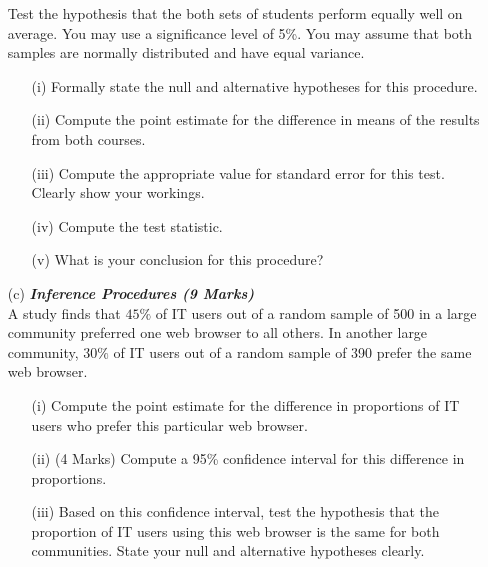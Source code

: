 \documentclass[]{article}
\begin{document}
\begin{itemize}
Test the hypothesis that the both sets of students perform equally well on average. You may use a significance level of 5\%. You may assume that both samples are normally distributed and have equal variance.
\begin{itemize}
\item[(i)]  Formally state the null and alternative hypotheses for this procedure.
\item[(ii)]  Compute the point estimate for the difference in means of the results from both courses.
\item[(iii)]  Compute the appropriate value for standard error for this test. Clearly show your workings.
\item[(iv)]  Compute the test statistic.
\item[(v)]  What is your conclusion for this procedure?
\end{itemize}

\newpage
\item[(c)] \textbf{\textit{Inference Procedures (9 Marks)}}\\A study finds that $45\%$ of IT users out of a random sample of 500 in a large
community preferred one web browser to all others. In another large community, $30\%$ of IT users out of a random sample of 390 prefer the same web browser.

\begin{itemize}
\item[(i)]  Compute the point estimate for the difference in proportions of IT users who prefer this particular web browser.
\item[(ii)] (4 Marks) Compute a 95\% confidence interval for this difference in proportions.
\item[(iii)]  Based on this confidence interval, test the hypothesis that the proportion of IT users using this web browser is the same for both communities. State your null and alternative hypotheses clearly.
\end{itemize}

\end{itemize}
\end{document}

